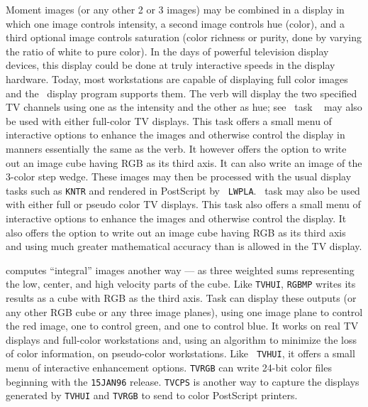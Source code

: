      Moment images (or any other 2 or 3 images) may be combined in a
display in which one image controls intensity, a second image controls
hue (color), and a third optional image controls saturation (color
richness or purity, done by varying the ratio of white to pure color).
In the days of powerful television display devices, this display could
be done at truly interactive speeds in the display hardware.  Today,
most workstations are capable of displaying full color images and the
\AIPS\ display program supports them.  The verb {\tt {}}
will display the two specified TV channels using one as the intensity
and the other as hue; see   \AIPS\ task {\tt
{}} may also be used with either full-color TV displays.
This task offers a small menu of interactive options to enhance the
images and otherwise control the display in manners essentially the
same as the verb.  It however offers the option to write out an image
cube having RGB as its third axis. It can also write an image of the
3-color step wedge.  These images may then be processed with the usual
display tasks such as {\tt KNTR} and rendered in PostScript by {\tt
LWPLA}\@.  \AIPS\ task {\tt {}} may also be used with either
full or pseudo color TV displays.  This task also offers a small menu
of interactive options to enhance the images and otherwise control the
display.  It also offers the option to write out an image cube having
RGB as its third axis and using much greater mathematical accuracy
than is allowed in the TV display.

  {\tt {}} computes ``integral'' images another way --- as
three weighted sums representing the low, center, and high velocity
parts of the cube.  Like {\tt TVHUI}, {\tt RGBMP} writes its results
as a cube with RGB as the third axis.  Task {\tt {}} can
display these outputs (or any other RGB cube or any three image
planes), using one image plane to control the red image, one to
control green, and one to control blue.  It works on real TV displays
and full-color workstations and, using an algorithm to minimize the
loss of color information, on pseudo-color workstations.  Like {\tt
TVHUI}, it offers a small menu of interactive enhancement options.
{\tt TVRGB} can write 24-bit color  files beginning
with the {\tt 15JAN96} release. {\tt TVCPS} is another way to capture
the displays generated by {\tt TVHUI} and {\tt TVRGB} to send to color
PostScript printers.

